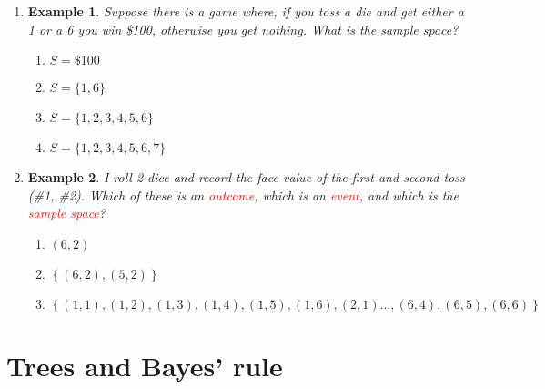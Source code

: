 \documentclass[12pt,twoside]{article}
\numberwithin{equation}{section}
\newtheorem{example}{Example}
\begin{document}
\begin{enumerate}
	\item[] %
	\begin{example}
	Suppose there is a game where, if you toss a die and get either a 1 or a 6 you win \$100, otherwise you get nothing. What is the \textcolor{ChadRed}{sample space}?
		\begin{enumerate}
			\item $S=\$100$
			\item $S=\{1,6\}$
			\item $S=\{1,2,3,4,5,6\}$
			\item $S=\{1,2,3,4,5,6,7\}$
		\end{enumerate}
	\end{example}
	
	\item[] %
	\begin{example}
		I roll 2 dice and record the face value of the first and second toss (\#1, \#2). Which of these is an \textcolor{red}{outcome}, which is an \textcolor{red}{event}, and which is the \textcolor{red}{sample space}?
		\begin{enumerate}
			\item $(6,2)$
			\item $\left\{(6,2), (5,2)\right\}$
			\item $\left\{(1,1), (1,2), (1,3), (1,4), (1,5), (1,6), (2,1) \dots, (6,4), (6,5), (6,6)\right\}$
		\end{enumerate}
	\end{example}


\end{enumerate}

\clearpage
\section{Trees and Bayes' rule}
\end{document}
